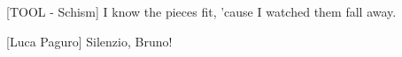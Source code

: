 
\begin{ntquote}
[TOOL - Schism]{%
    I know the pieces fit, 'cause I watched them fall away.
}
\end{ntquote}

\begin{ntquote}
[Luca Paguro]{%
    Silenzio, Bruno!
}
\end{ntquote}

\endquote
